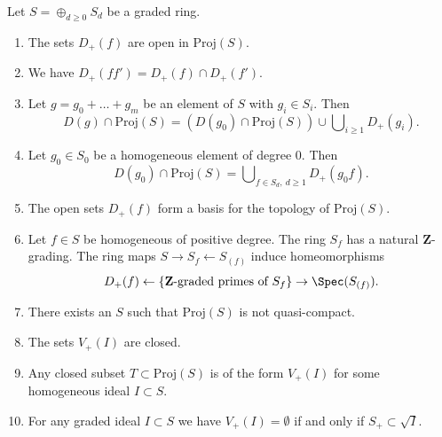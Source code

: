 \begin{lemma}
\label{lemma-topology-proj}
Let $S = \oplus_{d \geq 0} S_d$ be a graded ring.
\begin{enumerate}
\item The sets $D_{+}(f)$ are open in $\text{Proj}(S)$.
\item We have $D_{+}(ff') = D_{+}(f) \cap D_{+}(f')$.
\item Let $g = g_0 + \ldots + g_m$ be an element
of $S$ with $g_i \in S_i$. Then
$$
D(g) \cap \text{Proj}(S) =
(D(g_0) \cap \text{Proj}(S))
\cup
\bigcup\nolimits_{i \geq 1} D_{+}(g_i).
$$
\item
Let $g_0\in S_0$ be a homogeneous element of degree $0$. Then
$$
D(g_0) \cap \text{Proj}(S)
=
\bigcup\nolimits_{f \in S_d, \ d\geq 1} D_{+}(g_0 f).
$$
\item The open sets $D_{+}(f)$ form a
basis for the topology of $\text{Proj}(S)$.
\item Let $f \in S$ be homogeneous of positive degree.
The ring $S_f$ has a natural $\mathbf{Z}$-grading.
The ring maps $S \to S_f \leftarrow S_{(f)}$ induce
homeomorphisms
$$
D_{+}(f)
\leftarrow
\{\mathbf{Z}\text{-graded primes of }S_f\}
\to
\Spec(S_{(f)}).
$$
\item There exists an $S$ such that $\text{Proj}(S)$ is not
quasi-compact.
\item The sets $V_{+}(I)$ are closed.
\item Any closed subset $T \subset \text{Proj}(S)$ is of
the form $V_{+}(I)$ for some homogeneous ideal $I \subset S$.
\item For any graded ideal $I \subset S$ we have
$V_{+}(I) = \emptyset$ if and only if $S_{+} \subset \sqrt{I}$.
\end{enumerate}
\end{lemma}

